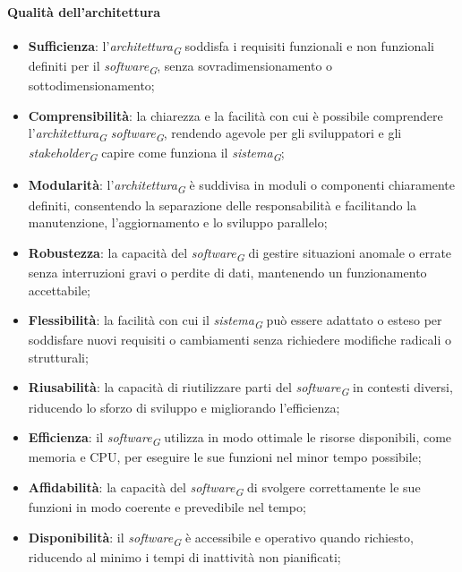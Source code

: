 \paragraph{Qualità dell'architettura}
\begin{itemize}
    \item \textbf{Sufficienza}: l'\textit{architettura}\textsubscript{\textit{G}} soddisfa i requisiti funzionali e non funzionali definiti per il \textit{software}\textsubscript{\textit{G}}, senza sovradimensionamento o sottodimensionamento;
    \item \textbf{Comprensibilità}: la chiarezza e la facilità con cui è possibile comprendere l'\textit{architettura}\textsubscript{\textit{G}} \textit{software}\textsubscript{\textit{G}}, rendendo agevole per gli sviluppatori e gli \textit{stakeholder}\textsubscript{\textit{G}} capire come funziona il \textit{sistema}\textsubscript{\textit{G}};
    \item \textbf{Modularità}: l'\textit{architettura}\textsubscript{\textit{G}} è suddivisa in moduli o componenti chiaramente definiti, consentendo la separazione delle responsabilità e facilitando la manutenzione, l'aggiornamento e lo sviluppo parallelo;
    \item \textbf{Robustezza}: la capacità del \textit{software}\textsubscript{\textit{G}} di gestire situazioni anomale o errate senza interruzioni gravi o perdite di dati, mantenendo un funzionamento accettabile;
    \item \textbf{Flessibilità}: la facilità con cui il \textit{sistema}\textsubscript{\textit{G}} può essere adattato o esteso per soddisfare nuovi requisiti o cambiamenti senza richiedere modifiche radicali o strutturali;
    \item \textbf{Riusabilità}: la capacità di riutilizzare parti del \textit{software}\textsubscript{\textit{G}} in contesti diversi, riducendo lo sforzo di sviluppo e migliorando l'efficienza;
    \item \textbf{Efficienza}: il \textit{software}\textsubscript{\textit{G}} utilizza in modo ottimale le risorse disponibili, come memoria e CPU, per eseguire le sue funzioni nel minor tempo possibile;
    \item \textbf{Affidabilità}: la capacità del \textit{software}\textsubscript{\textit{G}} di svolgere correttamente le sue funzioni in modo coerente e prevedibile nel tempo;
    \item \textbf{Disponibilità}: il \textit{software}\textsubscript{\textit{G}} è accessibile e operativo quando richiesto, riducendo al minimo i tempi di inattività non pianificati;

\end{itemize}
